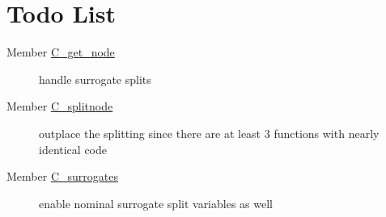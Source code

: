 \hypertarget{todo}{}\section{Todo List}\label{todo}
\label{todo__todo000002}
\hypertarget{todo__todo000002}{}
 \begin{description}
\item[Member \hyperlink{Predict_8c_a1}{C\_\-get\_\-node} ]handle surrogate splits \end{description}


\label{todo__todo000001}
\hypertarget{todo__todo000001}{}
 \begin{description}
\item[Member \hyperlink{Predict_8c_a0}{C\_\-splitnode} ]outplace the splitting since there are at least 3 functions with nearly identical code \end{description}


\label{todo__todo000003}
\hypertarget{todo__todo000003}{}
 \begin{description}
\item[Member \hyperlink{SurrogateSplits_8c_a0}{C\_\-surrogates} ]enable nominal surrogate split variables as well \end{description}
